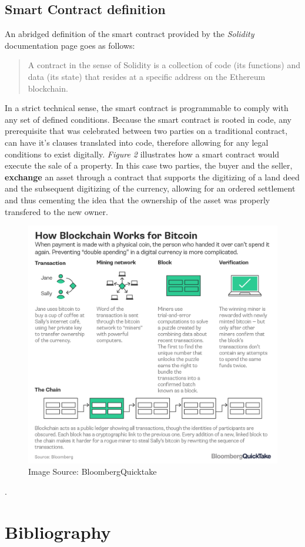 \documentclass[submission,copyright,creativecommons]{eptcs}
\begin{document}
\subsection{Smart Contract definition}
An abridged definition of the smart contract provided by the \textit{Solidity} documentation page goes as follows:
\begin{quote}
    A contract in the sense of Solidity is a collection of code (its functions) and data (its state) that resides at a specific address on the Ethereum blockchain.\cite{IntroductionSmartContracts}
\end{quote}
In a strict technical sense, the smart contract is programmable to comply with any set of defined conditions.  Because the smart contract is rooted in code, any prerequisite that was celebrated between two parties on a traditional contract, can have it's clauses translated into code, therefore allowing for any legal conditions to exist digitally.
\textit{Figure 2} illustrates how a smart contract would execute the sale of a property.  In this case two parties, the buyer and the seller, \textbf{exchange} an asset through a contract that supports the digitizing of a land deed and the subsequent digitizing of the currency, allowing for an ordered settlement and thus cementing the idea that the ownership of the asset was properly transfered to the new owner.
\begin{figure}[h]
    \centering
    \label{fig:my_label}
    \includegraphics[width=5in]{bitcoin-blockchain-bloomberg}
     \caption{Image Source: BloombergQuicktake}
\end{figure}.

\newpage
\section{Bibliography}






\end{document}
